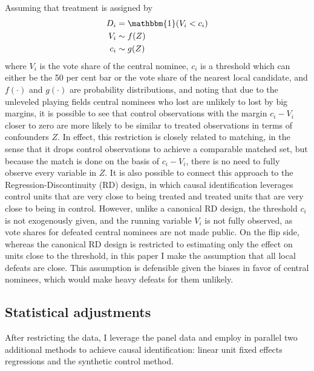 \documentclass[12pt]{article}\usepackage[]{graphicx}\usepackage[]{color}
\newcommand{\1}{\mathbbm{1}}
\begin{document}
Assuming that treatment is assigned by
\begin{align*}
	D_i &= \1(V_i < c_i) \\
	V_i &\sim f(Z) \\
	c_i &\sim g(Z)
\end{align*}
where $V_i$ is the vote share of the central nominee, $c_i$ is a threshold which can either be the 50 per cent bar or the vote share of the nearest local candidate, and $f(\cdot)$ and $g(\cdot)$ are probability distributions, and noting that due to the unleveled playing fields central nominees who lost are unlikely to lost by big margins, it is possible to see that control observations with the margin $c_i - V_i$ closer to zero are more likely to be similar to treated observations in terms of confounders $Z$. In effect, this restriction is closely related to matching, in the sense that it drops control observations to achieve a comparable matched set, but because the match is done on the basis of $c_i-V_i$, there is no need to fully observe every variable in $Z$. It is also possible to connect this approach to the Regression-Discontinuity (RD) design, in which causal identification leverages control units that are very close to being treated and treated units that are very close to being in control. However, unlike a canonical RD design, the threshold $c_i$ is not exogenously given, and the running variable $V_i$ is not fully observed, as vote shares for defeated central nominees are not made public. On the flip side, whereas the canonical RD design is restricted to estimating only the effect on units close to the threshold, in this paper I make the assumption that all local defeats are close. This assumption is defensible given the biases in favor of central nominees, which would make heavy defeats for them unlikely.

\subsection{Statistical adjustments}
After restricting the data, I leverage the panel data and employ in parallel two additional methods to achieve causal identification: linear unit fixed effects regressions and the synthetic control method. 
\end{document}
